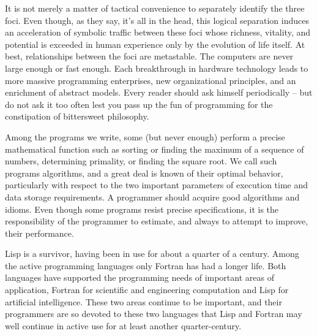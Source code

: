 It is not merely a matter of tactical convenience to separately identify the three foci.
Even though, as they say, it's all in the head,
this logical separation induces an acceleration of symbolic traffic between these foci whose richness, vitality,
and potential is exceeded in human experience only by the evolution of life itself.
At best, relationships between the foci are metastable.
The computers are never large enough or fast enough.
Each breakthrough in hardware technology leads to more massive programming enterprises,
new organizational principles, and an enrichment of abstract models.
Every reader should ask himself periodically 
-- but do not ask it too often lest you pass up the fun of programming for the constipation of bittersweet philosophy.

Among the programs we write, some (but never enough) perform a precise mathematical function
such as sorting or finding the maximum of a sequence of numbers, determining primality,
or finding the square root.
We call such programs algorithms, and a great deal is known of their optimal behavior,
particularly with respect to the two important parameters of execution time and data storage requirements.
A programmer should acquire good algorithms and idioms.
Even though some programs resist precise specifications,
it is the responsibility of the programmer to estimate, and always to attempt to improve, their performance.

Lisp is a survivor, having been in use for about a quarter of a century.
Among the active programming languages only Fortran has had a longer life.
Both languages have supported the programming needs of important areas of application,
Fortran for scientific and engineering computation and Lisp for artificial intelligence.
These two areas continue to be important, and their programmers are so devoted to these two languages
that Lisp and Fortran may well continue in active use for at least another quarter-century.

